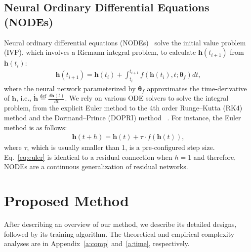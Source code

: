 \documentclass{article}
\theoremstyle{plain}
\theoremstyle{definition}
\theoremstyle{remark}
\begin{document}
\subsection{Neural Ordinary Differential Equations (NODEs)}
Neural ordinary differential equations (NODEs)~\cite{chen2018NODE} solve the initial value problem (IVP), which involves a Riemann integral problem, to calculate $\mathbf{h}(t_{i+1})$ from $\mathbf{h}(t_i)$:
\begin{align}\label{eq:node}
\mathbf{h}(t_{i+1}) = \mathbf{h}(t_i) + \int_{t_i}^{t_{i+1}} f(\mathbf{h}(t_i), t;\mathbf{\theta}_f) dt,
\end{align}where the neural network parameterized by $\mathbf{\theta}_f$ approximates the time-derivative of $\mathbf{h}$, i.e., $\dot{\mathbf{h}} \stackrel{\text{def}}{=}\frac{d\mathbf{h}(t)}{dt}$. We rely on various ODE solvers to solve the integral problem, from the explicit Euler method to the 4th order Runge--Kutta (RK4) method and the Dormand--Prince (DOPRI) method ~\cite{dormand1980dopri}. For instance, the Euler method is as follows:
\begin{align}\label{eq:euler}
\mathbf{h}(t + h) = \mathbf{h}(t) + \tau \cdot f(\mathbf{h}(t)),
\end{align}where $\tau$, which is usually smaller than 1, is a pre-configured step size. Eq.~\eqref{eq:euler} is identical to a residual connection when $h=1$ and therefore, NODEs are a continuous generalization of residual networks.






\section{Proposed Method}
After describing an overview of our method, we describe its detailed designs, followed by its training algorithm. The theoretical and empirical complexity analyses are in Appendix~\ref{a:comp} and~\ref{a:time}, respectively.
\end{document}
